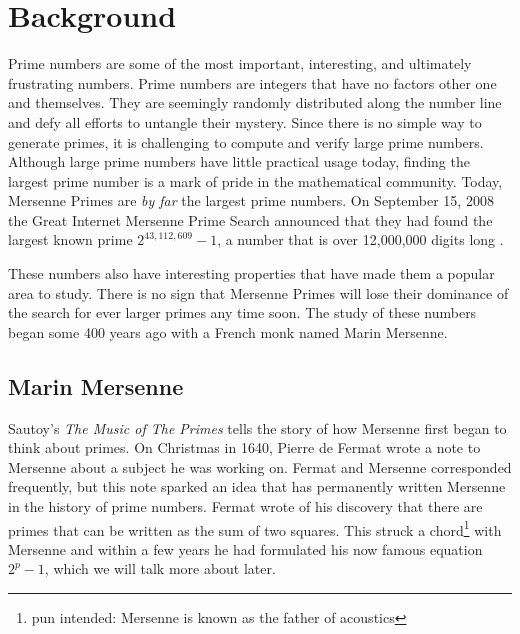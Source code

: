 \section{Background}

Prime numbers are some of the most important, interesting, and ultimately frustrating numbers. Prime numbers are integers that have no factors other one and themselves. They are seemingly randomly distributed along the number line and defy all efforts to untangle their mystery. 
Since there is no simple way to generate primes, it is challenging to compute and verify large
prime numbers. Although large prime numbers have little practical usage today, finding the
largest prime number is a mark of pride in the mathematical community. 
Today, Mersenne Primes are \textit{by far} the largest prime numbers.  
On September 15, 2008 the Great Internet Mersenne Prime Search announced that they had found the largest known prime $2^{43,112,609}-1$, a number that is over 12,000,000 digits long \cite{gimps}.

These numbers also have interesting properties that have made them a popular area to study. There is no sign that Mersenne Primes will lose their dominance of the search for ever larger primes any time soon. The study of these numbers began some 400 years ago with a French monk named Marin Mersenne.

\subsection{Marin Mersenne}

Sautoy's \textit{The Music of The Primes} \cite{sautoy} tells the story of how Mersenne first began to think about primes. On Christmas in 1640, Pierre de Fermat wrote a note to Mersenne about a subject he was working on. Fermat and Mersenne corresponded frequently, but this note sparked an idea that has permanently written Mersenne in the history of prime numbers. Fermat wrote of his discovery that there are primes that can be written as the sum of two squares.  This struck a chord\footnote{pun intended: Mersenne is known as the father of acoustics} with Mersenne and within a few years he had formulated his now famous equation $2^p - 1$, which we will talk more about later.  

